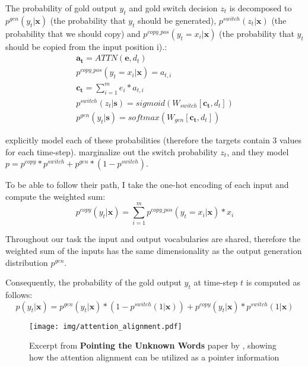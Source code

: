 The probability of gold output $y_t$ and gold switch decision $z_t$ is decomposed to $p^{gen}(y_t|\boldsymbol{x})$ (the probability that $y_t$ should be generated), $p^{switch}(z_t|\boldsymbol{x})$ (the probability that we should copy) and $p^{copy\_pos}(y_t = x_i |\boldsymbol{x})$ (the probability that $y_t$ should be copied from the input position i).:
\begin{gather}
    \boldsymbol{a_t} = ATTN(\boldsymbol{e}, d_t) \\
    p^{copy\_pos}(y_t = x_i | \boldsymbol{x}) = a_{t, i} \\
    \boldsymbol{c_t} = \sum_{i=1}^m{e_i * a_{t, i}} \\
    p^{switch}(z_t | \boldsymbol{s}) = sigmoid(W_{switch}[\boldsymbol{c_t}, d_t]) \\
    p^{gen}(y_t | \boldsymbol{s}) = softmax(W_{gen}[\boldsymbol{c_t}, d_t])
\end{gather}

\citep{gulcehre2016pointing} explicitly model each of these probabilities (therefore the targets contain 3 values for each time-step). \citep{yang2016referenceaware} marginalize out the switch probability $z_t$, and they model $p = p^{copy} * p^{switch} + p^{gen} * (1 - p^{switch})$.

To be able to follow their path, I take the one-hot encoding of each input and compute the weighted sum:
\begin{equation}
    p^{copy}(y_t|\boldsymbol{x}) = \sum_{i=1}^m{p^{copy\_pos}(y_t = x_i | \boldsymbol{x}) * x_i}
\end{equation}

Throughout our task the input and output vocabularies are shared, therefore the weighted sum of the inputs has the same dimensionality as the output generation distribution $p^{gen}$.

Consequently, the probability of the gold output $y_t$ at time-step $t$ is computed as follows:
\begin{equation}
    p(y_t|\boldsymbol{x}) = p^{gen}(y_t|\boldsymbol{x})*(1-p^{switch}(1|\boldsymbol{x})) + p^{copy}(y_t|\boldsymbol{x})*p^{switch}(1|\boldsymbol{x})
\end{equation}

\begin{figure}[hb]
    \centering
    \texttt{[image: img/attention\_alignment.pdf]}
    \caption{Excerpt from \textbf{Pointing the Unknown Words} paper by \citep{gulcehre2016pointing}, showing how the attention alignment can be utilized as a pointer information}
\end{figure}